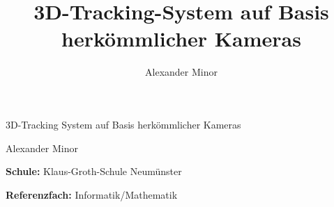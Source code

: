 \documentclass[11pt]{article}
\title{\Large{\textbf{3D-Tracking-System auf Basis herkömmlicher Kameras}}}
\author{Alexander Minor}
\begin{document}
\begin{titlepage}
  \begin{center}
    \vspace*{3cm}

    {\LARGE{3D-Tracking System auf Basis herkömmlicher Kameras}}

    \vspace{0.5cm}
    {\normalsize{Alexander Minor}}

    \vspace{3.5cm}

    \raggedright{\textbf{Schule:} Klaus-Groth-Schule Neumünster} \\
    \vspace{0.2cm}
    \raggedright{\textbf{Referenzfach:} Informatik/Mathematik} \\
    \vspace{0.2cm}

  \end{center}
\end{titlepage}

\newpage
\tableofcontents
\end{document}
